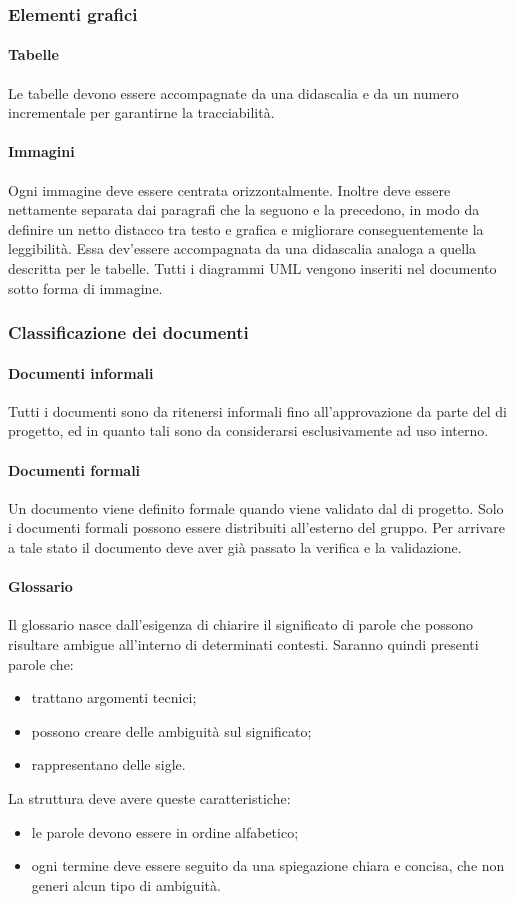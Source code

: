 \subsubsection{Elementi grafici}
 \paragraph{Tabelle} 
 Le tabelle devono essere accompagnate da una didascalia e da un numero incrementale per
garantirne la tracciabilità.
 \paragraph{Immagini}
Ogni immagine deve essere centrata orizzontalmente. Inoltre deve
essere nettamente separata dai paragrafi che la seguono e la precedono, in modo da definire un netto distacco tra testo e grafica e migliorare conseguentemente la leggibilità. Essa dev'essere accompagnata da una didascalia analoga a quella descritta per le tabelle. Tutti i diagrammi
UML vengono inseriti nel documento sotto forma di immagine.
\subsubsection{Classificazione dei documenti}
 \paragraph{Documenti informali}
 Tutti i documenti sono da ritenersi informali fino all'approvazione da parte del \RESP{} di progetto, ed in quanto tali sono da considerarsi esclusivamente ad uso interno.
 \paragraph{Documenti formali}
 Un documento viene definito formale quando viene validato dal \RESP{} di progetto. Solo i documenti formali possono essere distribuiti all'esterno del gruppo. Per arrivare a tale stato il
documento deve aver già passato la verifica e la validazione.
 \paragraph{Glossario}
Il glossario nasce dall'esigenza di chiarire il significato di parole che possono risultare ambigue all'interno di determinati contesti. Saranno quindi presenti parole che:
\begin{itemize}
	\item trattano argomenti tecnici;
	\item possono creare delle ambiguità sul significato;
	\item rappresentano delle sigle.
\end{itemize}
La struttura deve avere queste caratteristiche:
\begin{itemize}
	\item le parole devono essere in ordine alfabetico;
	\item ogni termine deve essere seguito da una spiegazione chiara e concisa, che non generi alcun tipo di ambiguità.
\end{itemize}
